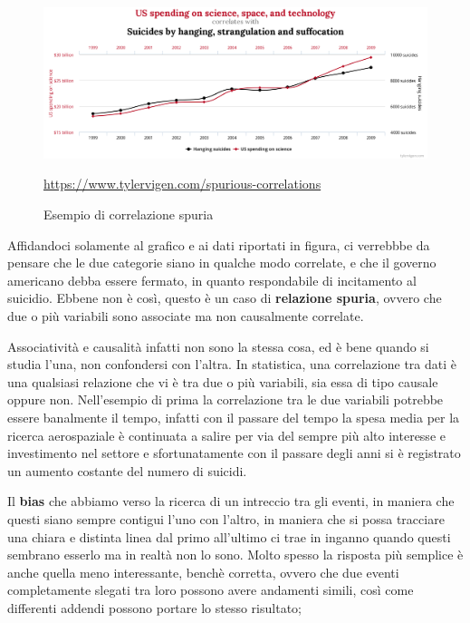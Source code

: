 \begin{figure}[h]
    \begin{center}
        \includegraphics[width=\linewidth]{img/chart.png}
        \caption{Esempio di correlazione spuria}
        \url{https://www.tylervigen.com/spurious-correlations}
        \label{fig:spurious_relations}
    \end{center}
\end{figure}

Affidandoci solamente al grafico e ai dati riportati in 
figura, ci verrebbbe da pensare che le due categorie 
siano in qualche modo correlate, e che il governo 
americano debba essere fermato, in quanto respondabile di 
incitamento al suicidio.
Ebbene non è così, questo è un caso di \textbf{relazione 
spuria}, ovvero che due o 
più variabili sono associate ma non causalmente correlate.

Associatività e causalità infatti non sono la stessa cosa,
ed è bene quando si studia l'una, non confondersi con l'altra.
In statistica, una correlazione tra dati è una qualsiasi 
relazione che vi è tra due o più variabili, sia essa di 
tipo causale oppure non. 
Nell'esempio di prima la correlazione
tra le due variabili potrebbe essere banalmente il tempo, 
infatti con il passare del tempo la spesa media per la 
ricerca aerospaziale è continuata a salire per via 
del sempre più alto interesse e investimento nel settore
e sfortunatamente con il passare degli anni si è registrato
un aumento costante del numero di suicidi. 

Il \textbf{bias} che abbiamo verso la ricerca di un intreccio
tra gli eventi, in maniera che questi siano sempre contigui
l'uno con l'altro, in maniera che si possa tracciare una 
chiara e distinta linea dal primo all'ultimo ci trae in 
inganno quando questi sembrano esserlo ma in realtà non lo sono.
Molto spesso la risposta più semplice è anche quella meno 
interessante, benchè corretta, ovvero che due eventi 
completamente slegati tra loro possono avere andamenti simili, 
così come differenti addendi possono portare lo stesso risultato; 

